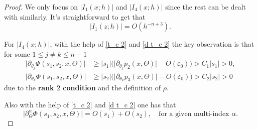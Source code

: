 \documentclass[12pt,reqno]{amsart}
\renewcommand{\epsilon}{\varepsilon}
\numberwithin{equation}{section}
\begin{document}
\begin{proof}
We only focus on $\Big| {I}_1 (x; h) \Big|$ and $\Big| {I}_4 (x; h) \Big|$ since the rest can be dealt with similarly. It's straightforward to get that 
\begin{equation}\label{last1'}
\Big| {I}_1 (z; h)\Big|=O(h^{-n+3}).
\end{equation}


For $\Big| {I}_4 (x; h) \Big|$, %
with the help of \eqref{t_c 2} and \eqref{d t_c 2} the key observation is that for some $1\leq j\neq k\leq n-1$
\begin{align}
\big| \partial_{\theta_j} \Phi(s_1,s_2,x,\Theta) \big|&\geq|s_1| \big(\big|\partial_{\theta_j} p_2(x, \Theta)\big|-O(\epsilon_0)\big)>C_1|s_1|>0, \label{rank2 1}\\
\big| \partial_{\theta_k} \Phi(s_1,s_2,x,\Theta) \big|&\geq|s_2| \big(\big|\partial_{\theta_k} p_3(x, \Theta)\big|-O(\epsilon_0)\big)>C_2|s_2|>0 \label{rank2 2}
\end{align}
due to the {\bf rank $2$ condition}  and the definition of $\rho$.

Also with the help of \eqref{t_c 2} and \eqref{d t_c 2} one has that
\begin{equation}\label{s1s2}
\big|\partial_{\Theta}^\alpha \Phi(s_1, s_2, x,\Theta)\big|=O(s_1)+O(s_2), \quad\text{for a given multi-index } \alpha.
\end{equation}



\end{proof}
\end{document}
